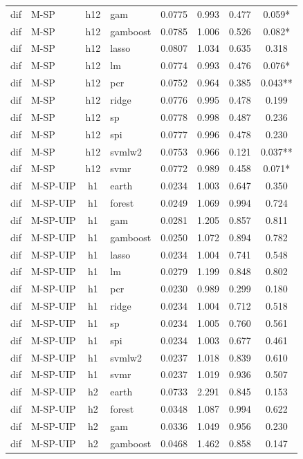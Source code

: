 \begin{ThreePartTable}
\begin{longtable}[t]{llclcccc}
dif & M-SP & h12 & gam & 0.0775 & 0.993 & 0.477 & 0.059*\\
dif & M-SP & h12 & gamboost & 0.0785 & 1.006 & 0.526 & 0.082*\\
dif & M-SP & h12 & lasso & 0.0807 & 1.034 & 0.635 & 0.318\\
dif & M-SP & h12 & lm & 0.0774 & 0.993 & 0.476 & 0.076*\\
dif & M-SP & h12 & pcr & 0.0752 & 0.964 & 0.385 & 0.043**\\
dif & M-SP & h12 & ridge & 0.0776 & 0.995 & 0.478 & 0.199\\
dif & M-SP & h12 & sp & 0.0778 & 0.998 & 0.487 & 0.236\\
dif & M-SP & h12 & spi & 0.0777 & 0.996 & 0.478 & 0.230\\
dif & M-SP & h12 & svmlw2 & 0.0753 & 0.966 & 0.121 & 0.037**\\
dif & M-SP & h12 & svmr & 0.0772 & 0.989 & 0.458 & 0.071*\\
\addlinespace
dif & M-SP-UIP & h1 & earth & 0.0234 & 1.003 & 0.647 & 0.350\\
dif & M-SP-UIP & h1 & forest & 0.0249 & 1.069 & 0.994 & 0.724\\
dif & M-SP-UIP & h1 & gam & 0.0281 & 1.205 & 0.857 & 0.811\\
dif & M-SP-UIP & h1 & gamboost & 0.0250 & 1.072 & 0.894 & 0.782\\
dif & M-SP-UIP & h1 & lasso & 0.0234 & 1.004 & 0.741 & 0.548\\
dif & M-SP-UIP & h1 & lm & 0.0279 & 1.199 & 0.848 & 0.802\\
dif & M-SP-UIP & h1 & pcr & 0.0230 & 0.989 & 0.299 & 0.180\\
dif & M-SP-UIP & h1 & ridge & 0.0234 & 1.004 & 0.712 & 0.518\\
dif & M-SP-UIP & h1 & sp & 0.0234 & 1.005 & 0.760 & 0.561\\
dif & M-SP-UIP & h1 & spi & 0.0234 & 1.003 & 0.677 & 0.461\\
dif & M-SP-UIP & h1 & svmlw2 & 0.0237 & 1.018 & 0.839 & 0.610\\
dif & M-SP-UIP & h1 & svmr & 0.0237 & 1.019 & 0.936 & 0.507\\
\addlinespace
dif & M-SP-UIP & h2 & earth & 0.0733 & 2.291 & 0.845 & 0.153\\
dif & M-SP-UIP & h2 & forest & 0.0348 & 1.087 & 0.994 & 0.622\\
dif & M-SP-UIP & h2 & gam & 0.0336 & 1.049 & 0.956 & 0.230\\
dif & M-SP-UIP & h2 & gamboost & 0.0468 & 1.462 & 0.858 & 0.147\\

\end{longtable}
\end{ThreePartTable}
